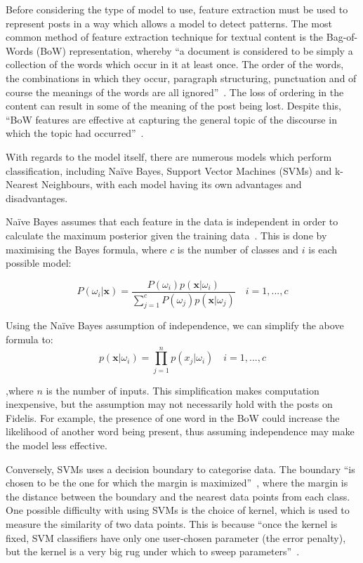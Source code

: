 Before considering the type of model to use, feature extraction must be used to represent posts in a way which allows a model to detect patterns. The most common method of feature extraction technique for textual content is the Bag-of-Words (BoW) representation, whereby ``a document is considered to be simply a collection of the words which occur in it at least once. The order of the words, the combinations in which they occur, paragraph structuring, punctuation and of course the meanings of the words are all ignored''~\cite{Bramer:BoW}. The loss of ordering in the content can result in some of the meaning of the post being lost. Despite this, ``BoW features are effective at capturing the general topic of the discourse in which the topic had occurred''~\cite{Jurafsky:BoW}.

With regards to the model itself, there are numerous models which perform classification, including Na\"ive Bayes, Support Vector Machines (SVMs) and k-Nearest Neighbours, with each model having its own advantages and disadvantages.

Na\"ive Bayes assumes that each feature in the data is independent in order to calculate the maximum posterior given the training data~\cite{Kuncheva:Bayes}. This is done by maximising the Bayes formula, where $c$ is the number of classes and $i$ is each possible model:

\begin{equation}
\label{eq:bayes}
P(\omega_{i}|\mathbf{x}) = \frac{P(\omega_{i})p(\mathbf{x}|\omega_{i})}{\sum_{j=1}^{c}P(\omega_{j})p(\mathbf{x}|\omega_{j})}\quad i=1,...,c
\end{equation}

\noindent Using the Na\"ive Bayes assumption of independence, we can simplify the above formula to:  
\begin{equation}
\label{eq:bayes-simple}
p(\mathbf{x}|\omega_{i})=\prod_{j=1}^{n}p(x_{j}|\omega_{i})\quad i=1,...,c
\end{equation}

\noindent ,where $n$ is the number of inputs. This simplification makes computation inexpensive, but the assumption may not necessarily hold with the posts on Fidelis. For example, the presence of one word in the BoW could increase the likelihood of another word being present, thus assuming independence may make the model less effective.

Conversely, SVMs uses a decision boundary to categorise data. The boundary ``is chosen to be the one for which the margin is maximized''~\cite{Bishop:SVM}, where the margin is the distance between the boundary and the nearest data points from each class. One possible difficulty with using SVMs is the choice of kernel, which is used to measure the similarity of two data points. This is because ``once the kernel is fixed, SVM classifiers have only one user-chosen parameter (the error penalty), but the kernel is a very big rug under which to sweep parameters''~\cite{Burges:SVM}.

